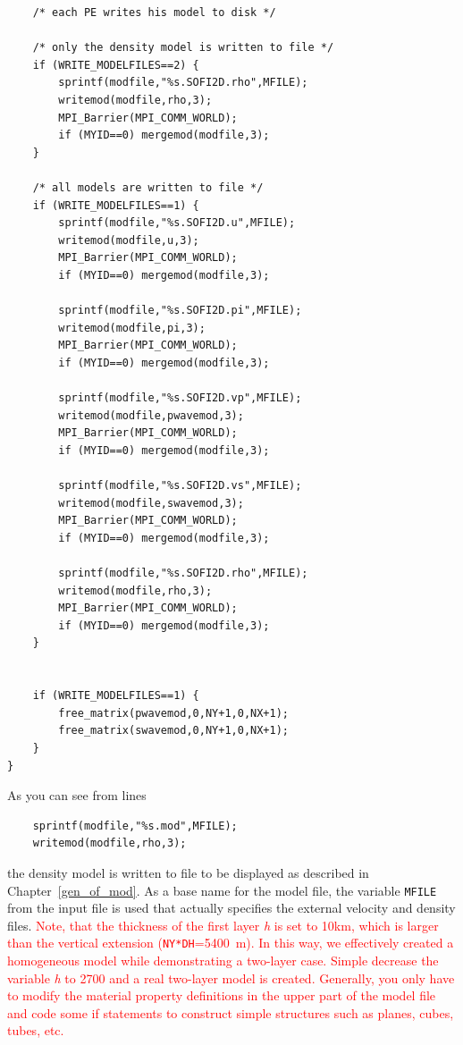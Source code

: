 \begin{verbatim}
	/* each PE writes his model to disk */

	/* only the density model is written to file */
	if (WRITE_MODELFILES==2) {
		sprintf(modfile,"%s.SOFI2D.rho",MFILE);
		writemod(modfile,rho,3);
		MPI_Barrier(MPI_COMM_WORLD);
		if (MYID==0) mergemod(modfile,3);
	}

	/* all models are written to file */
	if (WRITE_MODELFILES==1) {
		sprintf(modfile,"%s.SOFI2D.u",MFILE);
		writemod(modfile,u,3);
		MPI_Barrier(MPI_COMM_WORLD);
		if (MYID==0) mergemod(modfile,3);

		sprintf(modfile,"%s.SOFI2D.pi",MFILE);
		writemod(modfile,pi,3);
		MPI_Barrier(MPI_COMM_WORLD);
		if (MYID==0) mergemod(modfile,3);

		sprintf(modfile,"%s.SOFI2D.vp",MFILE);
		writemod(modfile,pwavemod,3);
		MPI_Barrier(MPI_COMM_WORLD);
		if (MYID==0) mergemod(modfile,3);

		sprintf(modfile,"%s.SOFI2D.vs",MFILE);
		writemod(modfile,swavemod,3);
		MPI_Barrier(MPI_COMM_WORLD);
		if (MYID==0) mergemod(modfile,3);

		sprintf(modfile,"%s.SOFI2D.rho",MFILE);
		writemod(modfile,rho,3);
		MPI_Barrier(MPI_COMM_WORLD);
		if (MYID==0) mergemod(modfile,3);
	}


	if (WRITE_MODELFILES==1) {
		free_matrix(pwavemod,0,NY+1,0,NX+1);
		free_matrix(swavemod,0,NY+1,0,NX+1);
	}
}
\end{verbatim}

As you can see from lines
\begin{verbatim}
	sprintf(modfile,"%s.mod",MFILE);
	writemod(modfile,rho,3);
\end{verbatim}
the density model is written to file to be displayed as described in Chapter~\ref{gen_of_mod}. As a base name for the model file, the variable \texttt{MFILE} from the input file is used that actually specifies the external velocity and density files. \textcolor{red}{Note, that the thickness of the first layer \textit{h} is set to \si{10}{km}, which is larger than the vertical extension (\texttt{NY*DH}=\SI{5400}{m}). In this way, we effectively created a homogeneous model while demonstrating a two-layer case. Simple decrease the variable \textit{h} to \SI{2700}{} and a real two-layer model is created. Generally, you only have to modify the material property definitions in the upper part of the model file and code some if statements to construct simple structures such as planes, cubes, tubes, etc.}


